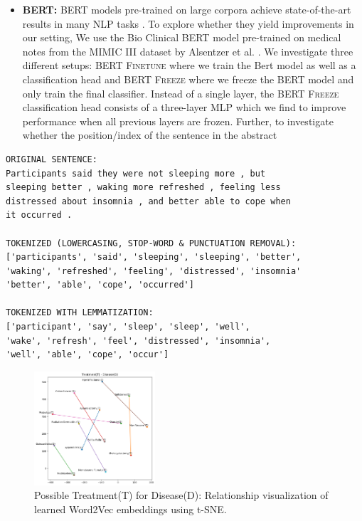 \begin{itemize}[leftmargin=0cm]
    \item[]
    \textbf{BERT:} BERT models pre-trained on large corpora achieve state-of-the-art results in many NLP tasks \cite{devlin2018bert}. To explore whether they yield improvements in our setting, We use the Bio Clinical BERT model pre-trained on medical notes from the MIMIC III dataset by Alsentzer et al. \cite{alsentzer2019publicly, johnson2016mimic}. We investigate three different setups: \textsc{BERT Finetune} where we train the Bert model as well as a classification head and \textsc{BERT Freeze} where we freeze the BERT model and only train the final classifier. Instead of a single layer, the \textsc{BERT Freeze} classification head consists of a three-layer MLP which we find to improve performance when all previous layers are frozen. Further, to investigate whether the position/index of the sentence in the abstract 
    



\end{itemize}


\begin{lstlisting}[frame=single, backgroundcolor=\color{light-gray}, basicstyle=\footnotesize\ttfamily,caption= {Example of a sentence before preprocessing (original), after tokenization with lowercasing and removal of stop-words and punctuation, and after tokenization with lemmatization.},captionpos=b,label={listing:example_preprocess}]
ORIGINAL SENTENCE:
Participants said they were not sleeping more , but 
sleeping better , waking more refreshed , feeling less 
distressed about insomnia , and better able to cope when 
it occurred .

TOKENIZED (LOWERCASING, STOP-WORD & PUNCTUATION REMOVAL):
['participants', 'said', 'sleeping', 'sleeping', 'better',
'waking', 'refreshed', 'feeling', 'distressed', 'insomnia'
'better', 'able', 'cope', 'occurred']

TOKENIZED WITH LEMMATIZATION:
['participant', 'say', 'sleep', 'sleep', 'well',
'wake', 'refresh', 'feel', 'distressed', 'insomnia',
'well', 'able', 'cope', 'occur']
\end{lstlisting}




\begin{figure}
    \includegraphics[width=0.40\textwidth]{figures/treatment_disease.png}
    \caption{Possible Treatment(T) for Disease(D): Relationship visualization of learned Word2Vec embeddings using t-SNE.}
    \label{fig:treatment-disease}
\end{figure}

